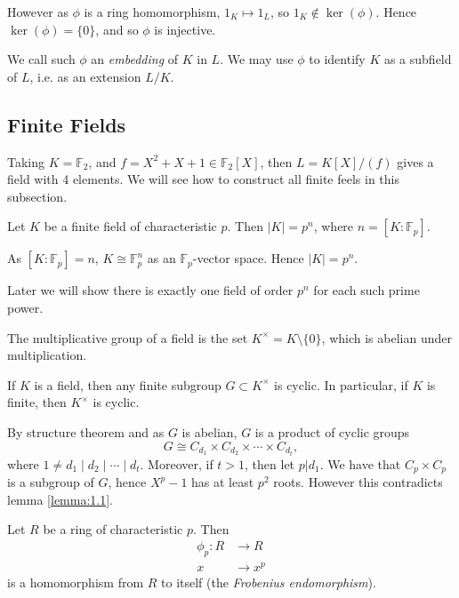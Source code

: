 \documentclass[12pt]{article}
\begin{document}
However as $\phi$ is a ring homomorphism, $1_K \mapsto 1_L$, so $1_K \not\in \ker(\phi)$. Hence $\ker(\phi) = \{0\}$, and so $\phi$ is injective.

We call such $\phi$ an \emph{embedding} of $K$ in $L$. We may use $\phi$ to identify $K$ as a subfield of $L$, i.e. as an extension $L/K$.

\subsection{Finite Fields}
\label{sub:finite_fields}

Taking $K = \mathbb{F}_2$, and $f = X^2 + X + 1 \in \mathbb{F}_2[X]$, then $L = K[X]/(f)$ gives a field with 4 elements. We will see how to construct all finite feels in this subsection.

\begin{proposition}
	Let $K$ be a finite field of characteristic $p$. Then $|K| = p^{n}$, where $n = [K: \mathbb{F}_p]$.
\end{proposition}

\begin{proofbox}
	As $[K: \mathbb{F}_p] = n$, $K \cong \mathbb{F}_p^n$ as an $\mathbb{F}_p$-vector space. Hence $|K| = p^{n}$.
\end{proofbox}

Later we will show there is exactly one field of order $p^{n}$ for each such prime power.

The multiplicative group of a field is the set $K^{\times} = K \setminus \{0\}$, which is abelian under multiplication.

\begin{proposition}
	If $K$ is a field, then any finite subgroup $G \subset K^{\times}$ is cyclic. In particular, if $K$ is finite, then $K^{\times}$ is cyclic.
\end{proposition}

\begin{proofbox}
	By structure theorem and as $G$ is abelian, $G$ is a product of cyclic groups
	\[
	G \cong C_{d_1} \times C_{d_2} \times \cdots \times C_{d_t},
	\]
	where $1 \neq d_1 \mid d_2 \mid \cdots \mid d_t$. Moreover, if $t > 1$, then let $p | d_1$. We have that $C_p \times C_p$ is a subgroup of $G$, hence $X^{p}-1$ has at least $p^2$ roots. However this contradicts lemma \ref{lemma:1.1}.
\end{proofbox}


\begin{proposition}
	Let $R$ be a ring of characteristic $p$. Then
	\begin{align*}
		\phi_p : R &\to R \\
		x &\to x^{p}
	\end{align*}
	is a homomorphism from $R$ to itself (the \emph{Frobenius endomorphism}).
\end{proposition}
\end{document}
